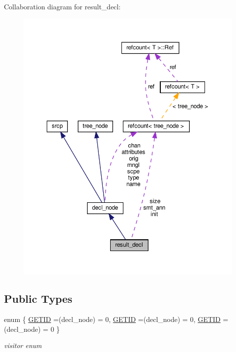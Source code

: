 Collaboration diagram for result\+\_\+decl\+:
\nopagebreak
\begin{figure}[H]
\begin{center}
\leavevmode
\includegraphics[width=350pt]{d2/da3/structresult__decl__coll__graph}
\end{center}
\end{figure}
\subsection*{Public Types}
\begin{DoxyCompactItemize}
\item 
enum \{ \hyperlink{structresult__decl_a51b6789320a6d7aac118baa2b1cc4ff6a8ded2f89f9f558ca0238c29019597cbb}{G\+E\+T\+ID} =(decl\+\_\+node) = 0, 
\hyperlink{structresult__decl_a51b6789320a6d7aac118baa2b1cc4ff6a8ded2f89f9f558ca0238c29019597cbb}{G\+E\+T\+ID} =(decl\+\_\+node) = 0, 
\hyperlink{structresult__decl_a51b6789320a6d7aac118baa2b1cc4ff6a8ded2f89f9f558ca0238c29019597cbb}{G\+E\+T\+ID} =(decl\+\_\+node) = 0
 \}\begin{DoxyCompactList}\small\item\em visitor enum \end{DoxyCompactList}
\end{DoxyCompactItemize}
